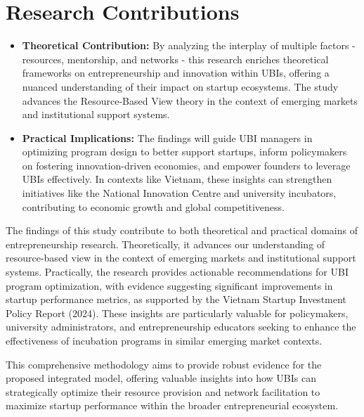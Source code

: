 \documentclass[../Main.tex]{subfiles}
\begin{document}
	\section{Research Contributions}
	\label{section:1.6_Research_contributions}
	\begin{itemize}
		\item \textbf{Theoretical Contribution:} By analyzing the interplay of multiple factors - resources, mentorship, and networks - this research enriches theoretical frameworks on entrepreneurship and innovation within UBIs, offering a nuanced understanding of their impact on startup ecosystems. The study advances the Resource-Based View theory in the context of emerging markets and institutional support systems.
		\item \textbf{Practical Implications:} The findings will guide UBI managers in optimizing program design to better support startups, inform policymakers on fostering innovation-driven economies, and empower founders to leverage UBIs effectively. In contexts like Vietnam, these insights can strengthen initiatives like the National Innovation Centre and university incubators, contributing to economic growth and global competitiveness.
	\end{itemize}

	The findings of this study contribute to both theoretical and practical domains of entrepreneurship research. Theoretically, it advances our understanding of resource-based view in the context of emerging markets and institutional support systems. Practically, the research provides actionable recommendations for UBI program optimization, with evidence suggesting significant improvements in startup performance metrics, as supported by the Vietnam Startup Investment Policy Report (2024). These insights are particularly valuable for policymakers, university administrators, and entrepreneurship educators seeking to enhance the effectiveness of incubation programs in similar emerging market contexts.

	This comprehensive methodology aims to provide robust evidence for the proposed integrated model, offering valuable insights into how UBIs can strategically optimize their resource provision and network facilitation to maximize startup performance within the broader entrepreneurial ecosystem.
	
\end{document}
